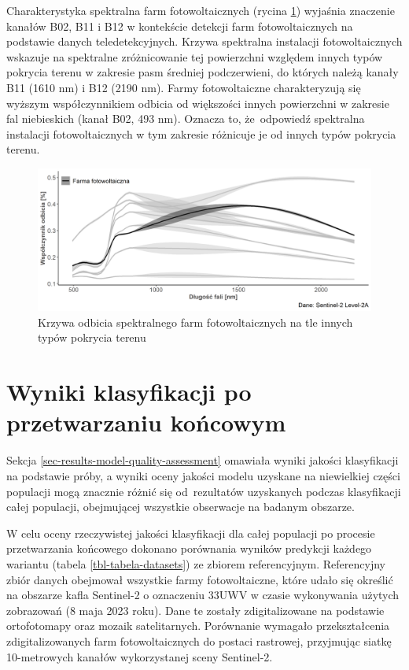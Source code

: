 \documentclass{amuthesis}
\begin{document}
Charakterystyka spektralna farm fotowoltaicznych (rycina
\ref{fig-rycina-spectral-curves}) wyjaśnia znaczenie kanałów B02, B11 i
B12 w kontekście detekcji farm fotowoltaicznych na podstawie danych
teledetekcyjnych. Krzywa spektralna instalacji fotowoltaicznych wskazuje
na spektralne zróżnicowanie tej powierzchni względem innych typów
pokrycia terenu w zakresie pasm średniej podczerwieni, do których należą
kanały B11 (1610 nm) i B12 (2190 nm). Farmy fotowoltaiczne
charakteryzują się wyższym współczynnikiem odbicia od większości innych
powierzchni w zakresie fal niebieskich (kanał B02, 493 nm). Oznacza to,
że~odpowiedź spektralna instalacji fotowoltaicznych w tym zakresie
różnicuje je od innych typów pokrycia terenu.

\begin{figure}[H]

{\centering \includegraphics[width=1\textwidth,height=\textheight]{figures/spectral_curves_plot2.png}

}

\caption{\label{fig-rycina-spectral-curves}Krzywa odbicia spektralnego
farm fotowoltaicznych na tle innych typów pokrycia terenu}

\end{figure}

\hypertarget{sec-classification-results}{%
\section{Wyniki klasyfikacji po przetwarzaniu
końcowym}\label{sec-classification-results}}

Sekcja \ref{sec-results-model-quality-assessment} omawiała wyniki
jakości klasyfikacji na podstawie próby, a wyniki oceny jakości modelu
uzyskane na niewielkiej części populacji mogą znacznie różnić się
od~rezultatów uzyskanych podczas klasyfikacji całej populacji,
obejmującej wszystkie obserwacje na badanym obszarze.

W celu oceny rzeczywistej jakości klasyfikacji dla całej populacji po
procesie przetwarzania końcowego dokonano porównania wyników predykcji
każdego wariantu (tabela \ref{tbl-tabela-datasets}) ze zbiorem
referencyjnym. Referencyjny zbiór danych obejmował wszystkie farmy
fotowoltaiczne, które udało się określić na obszarze kafla Sentinel-2 o
oznaczeniu 33UWV w czasie wykonywania użytych zobrazowań (8 maja 2023
roku). Dane te zostały zdigitalizowane na podstawie ortofotomapy oraz
mozaik satelitarnych. Porównanie wymagało przekształcenia
zdigitalizowanych farm fotowoltaicznych do postaci rastrowej, przyjmując
siatkę 10-metrowych kanałów wykorzystanej sceny Sentinel-2.
\end{document}
